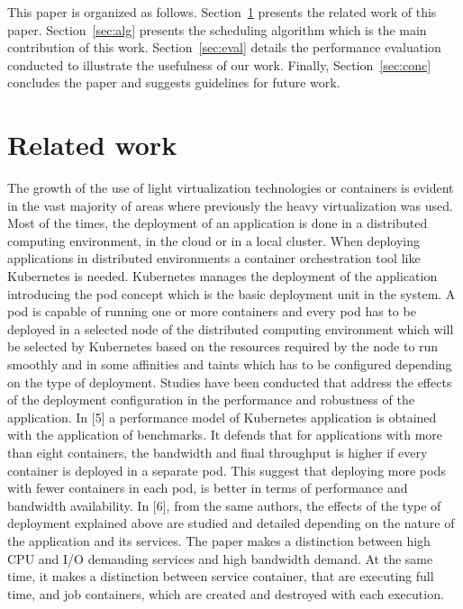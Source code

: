 \documentclass[conference]{IEEEtran}
\begin{document}
This paper is organized as follows. Section~\ref{sec:rel} presents the related work of this paper. Section~\ref{sec:alg} presents the scheduling algorithm which is the main contribution of this work. Section~\ref{sec:eval} details the performance evaluation conducted to illustrate the usefulness of our work. Finally, Section~\ref{sec:conc} concludes the paper and suggests guidelines for future work. 

\section{Related work}\label{sec:rel}

The growth of the use of light virtualization technologies or containers is evident in the vast majority of areas where previously the heavy virtualization was used.
Most of the times, the deployment of an application is done in a distributed computing environment, in the cloud or in a local cluster. When deploying
applications in distributed environments a container orchestration tool like Kubernetes is needed. Kubernetes manages the deployment of the application introducing
the pod concept which is the basic deployment unit in the system. A pod is capable of running one or more containers and every pod has to be deployed in 
a selected node of the distributed computing environment which will be selected by Kubernetes based on the resources required by the node to run smoothly and
in some affinities and taints which has to be configured depending on the type of deployment. Studies have been conducted that address the effects of the deployment 
configuration in the performance and robustness of the application. In [5] a performance model of Kubernetes application is obtained with the application of benchmarks.
It defends that for applications with more than eight containers, the bandwidth and final throughput is higher if every container is deployed in a separate pod. This suggest
that deploying more pods with fewer containers in each pod, is better in terms of performance and bandwidth availability. In [6], from the same authors, the 
effects of the type of deployment explained above are studied and detailed depending on the nature of the application and its services. The paper makes a
distinction between high CPU and I/O demanding services and high bandwidth demand. At the same time, it makes a distinction between service container,
that are executing full time, and job containers, which are created and destroyed with each execution. 
\end{document}
